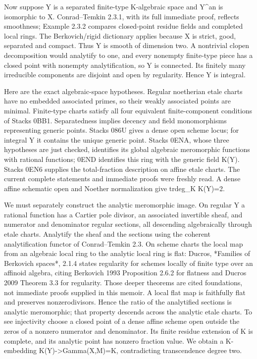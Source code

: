 \documentclass[11pt]{article}
\begin{document}
Now suppose Y is a separated finite-type K-algebraic space and Y\textasciicircum{}an is isomorphic to X. Conrad--Temkin 2.3.1, with its full immediate proof, reflects smoothness; Example 2.3.2 compares closed-point residue fields and completed local rings. The Berkovich/rigid dictionary applies because X is strict, good, separated and compact. Thus Y is smooth of dimension two. A nontrivial clopen decomposition would analytify to one, and every nonempty finite-type piece has a closed point with nonempty analytification, so Y is connected. Its finitely many irreducible components are disjoint and open by regularity. Hence Y is integral.

Here are the exact algebraic-space hypotheses. Regular noetherian etale charts have no embedded associated primes, so their weakly associated points are minimal. Finite-type charts satisfy all four equivalent finite-component conditions of Stacks 0BB1. Separatedness implies decency and field monomorphisms representing generic points. Stacks 086U gives a dense open scheme locus; for integral Y it contains the unique generic point. Stacks 0ENA, whose three hypotheses are just checked, identifies its global algebraic meromorphic functions with rational functions; 0END identifies this ring with the generic field K(Y). Stacks 0EN6 supplies the total-fraction description on affine etale charts. The current complete statements and immediate proofs were freshly read. A dense affine schematic open and Noether normalization give trdeg\_K K(Y)=2.

We must separately construct the analytic meromorphic image. On regular Y a rational function has a Cartier pole divisor, an associated invertible sheaf, and numerator and denominator regular sections, all descending algebraically through etale charts. Analytify the sheaf and the sections using the coherent analytification functor of Conrad--Temkin 2.3. On scheme charts the local map from an algebraic local ring to the analytic local ring is flat: Ducros, *Families of Berkovich spaces*, 2.1.4 states regularity for schemes locally of finite type over an affinoid algebra, citing Berkovich 1993 Proposition 2.6.2 for flatness and Ducros 2009 Theorem 3.3 for regularity. Those deeper theorems are cited foundations, not immediate proofs supplied in this memoir. A local flat map is faithfully flat and preserves nonzerodivisors. Hence the ratio of the analytified sections is analytic meromorphic; that property descends across the analytic etale charts. To see injectivity choose a closed point of a dense affine scheme open outside the zeros of a nonzero numerator and denominator. Its finite residue extension of K is complete, and its analytic point has nonzero fraction value. We obtain a K-embedding K(Y)->Gamma(X,M)=K, contradicting transcendence degree two.
\end{document}
